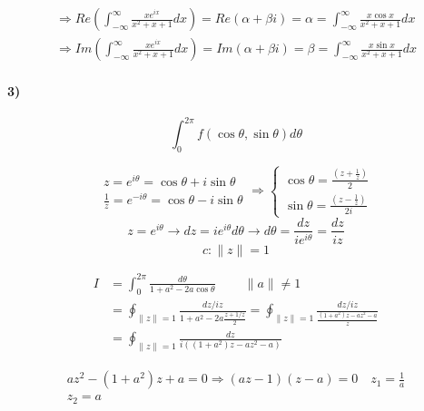 \begin{equation*}
\begin{split}
\Rightarrow Re( \int_{-\infty}^{\infty} \frac{xe^{ix}}{x^{2}+x+1}dx)=Re( \alpha +\beta i) =  \alpha =\int_{-\infty}^{\infty} \frac{x \cos x}{x^{2}+x+1}dx \\
\Rightarrow Im( \int_{-\infty}^{\infty} \frac{xe^{ix}}{x^{2}+x+1}dx)=Im( \alpha +\beta i) =  \beta =\int_{-\infty}^{\infty} \frac{x \sin x}{x^{2}+x+1}dx
\end{split}
\end{equation*}

\paragraph{3)}
\begin{equation*}
\int_0^{2\pi} f(\cos \theta, \sin \theta) d\theta 	
\end{equation*}

\[
\begin{aligned}
z=e^{i \theta} = \cos \theta + i \sin \theta \\
\frac {1}{z}=e^{-i \theta} = \cos \theta - i \sin \theta
\end{aligned}
\Rightarrow 
\begin{cases}
\cos \theta=\frac {(z+\frac {1}{z})}{2} \\
\sin \theta=\frac {(z-\frac {1}{z})}{2i}
\end{cases}
\]
\begin{equation*}
	z=e^{i \theta} \rightarrow dz=i e^{i\theta} d \theta \rightarrow d \theta=\frac{d z}{i e^{i \theta}}=\frac{d z}{i z}
\end{equation*}
\begin{equation*}
	c:\| z \|=1
\end{equation*}

\example
\[
\begin{aligned} I &=\int_{0}^{2 \pi} \frac{d \theta}{1+a^{2}-2 a \cos \theta} \ \ \ \ \ \  \ \ \ \ \|a\| \neq 1 \\ &=\oint_{\|z\|=1} \frac{d z / i z}{1+a^{2}- 2 a \frac{z+1 / z}{2}}=\oint_{\|z\|=1} \frac{d z / i z}{\frac {\left(1+a^{2}\right) z-a z^{2}-a}{z}} 
\\&=\oint_{\|z\|=1} \frac{d z} {i(\left(1+a^{2}\right) z-a z^{2}-a)} \end{aligned}
\]

\begin{equation*}
\begin{split}
a z^{2} - (1+a^{2})z+a = 0  \Rightarrow (az-1)(z-a)= 0	
\quad
z_{1}=\frac {1}{a} \\ z_{2} = a
\end{split}
\end{equation*}

